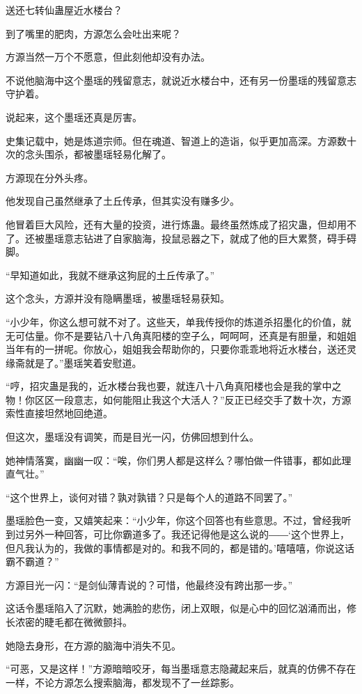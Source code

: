\begin{this_body}
送还七转仙蛊屋近水楼台？

到了嘴里的肥肉，方源怎么会吐出来呢？

方源当然一万个不愿意，但此刻他却没有办法。

不说他脑海中这个墨瑶的残留意志，就说近水楼台中，还有另一份墨瑶的残留意志守护着。

说起来，这个墨瑶还真是厉害。

史集记载中，她是炼道宗师。但在魂道、智道上的造诣，似乎更加高深。方源数十次的念头围杀，都被墨瑶轻易化解了。

方源现在分外头疼。

他发现自己虽然继承了土丘传承，但其实没有赚多少。

他冒着巨大风险，还有大量的投资，进行炼蛊。最终虽然炼成了招灾蛊，但却用不了。还被墨瑶意志钻进了自家脑海，投鼠忌器之下，就成了他的巨大累赘，碍手碍脚。

“早知道如此，我就不继承这狗屁的土丘传承了。”

这个念头，方源并没有隐瞒墨瑶，被墨瑶轻易获知。

“小少年，你这么想可就不对了。这些天，单我传授你的炼道杀招墨化的价值，就无可估量。你不是要钻八十八角真阳楼的空子么，呵呵呵，还真是有胆量，和姐姐当年有的一拼呢。你放心，姐姐我会帮助你的，只要你乖乖地将近水楼台，送还灵缘斋就是了。”墨瑶笑着安慰道。

“哼，招灾蛊是我的，近水楼台我也要，就连八十八角真阳楼也会是我的掌中之物！你区区一段意志，如何能阻止我这个大活人？”反正已经交手了数十次，方源索性直接坦然地回绝道。

但这次，墨瑶没有调笑，而是目光一闪，仿佛回想到什么。

她神情落寞，幽幽一叹：“唉，你们男人都是这样么？哪怕做一件错事，都如此理直气壮。”

“这个世界上，谈何对错？孰对孰错？只是每个人的道路不同罢了。”

墨瑶脸色一变，又嬉笑起来：“小少年，你这个回答也有些意思。不过，曾经我听到过另外一种回答，可比你霸道多了。我还记得他是这么说的――‘这个世界上，但凡我认为的，我做的事情都是对的。和我不同的，都是错的。’嘻嘻嘻，你说这话霸不霸道？”

方源目光一闪：“是剑仙薄青说的？可惜，他最终没有跨出那一步。”

这话令墨瑶陷入了沉默，她满脸的悲伤，闭上双眼，似是心中的回忆汹涌而出，修长浓密的睫毛都在微微颤抖。

她隐去身形，在方源的脑海中消失不见。

“可恶，又是这样！”方源暗暗咬牙，每当墨瑶意志隐藏起来后，就真的仿佛不存在一样，不论方源怎么搜索脑海，都发现不了一丝踪影。


\end{this_body}
